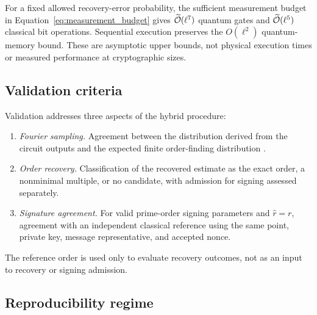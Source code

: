 \begin{revision}
For a fixed allowed recovery-error probability, the sufficient measurement budget in Equation~\eqref{eq:measurement_budget} gives $\widetilde{\mathcal{O}}(\ell^7)$ quantum gates and $\widetilde{\mathcal{O}}(\ell^5)$ classical bit operations. Sequential execution preserves the $O(\ell^2)$ quantum-memory bound. These are asymptotic upper bounds, not physical execution times or measured performance at cryptographic sizes. 
\end{revision}

\begin{revision}
\subsection{Validation criteria}

Validation addresses three aspects of the hybrid procedure:
\begin{enumerate}
    \item \emph{Fourier sampling.} Agreement between the distribution derived from the circuit outputs and the expected finite order-finding distribution \cite{Shor1997,Cleve1998,NielsenChuang2010}.

    \item \emph{Order recovery.} Classification of the recovered estimate as the exact order, a nonminimal multiple, or no candidate, with admission for signing assessed separately.

    \item \emph{Signature agreement.} For valid prime-order signing parameters and $\hat r=r$, agreement with an independent classical reference using the same point, private key, message representative, and accepted nonce.
\end{enumerate}
The reference order is used only to evaluate recovery outcomes, not as an input to recovery or signing admission.
\end{revision}


\subsection{Reproducibility regime}

